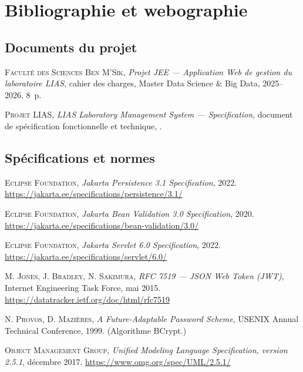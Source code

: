 \cleardoublepage
\chapter*{Bibliographie et webographie}

\section*{Documents du projet}

\begin{enumerate}[label={[\arabic*]},leftmargin=*]
  \item \textsc{Faculté des Sciences Ben M'Sik}, \emph{Projet JEE --- Application Web de
        gestion du laboratoire LIAS}, cahier des charges, Master Data Science \& Big Data,
        2025--2026, 8~p.
  \item \textsc{Projet LIAS}, \emph{LIAS Laboratory Management System --- Specification},
        document de spécification fonctionnelle et technique, .
\end{enumerate}

\section*{Spécifications et normes}

\begin{enumerate}[label={[\arabic*]},leftmargin=*,start=3]
  \item \textsc{Eclipse Foundation}, \emph{Jakarta Persistence 3.1 Specification}, 2022.
        \url{https://jakarta.ee/specifications/persistence/3.1/}
  \item \textsc{Eclipse Foundation}, \emph{Jakarta Bean Validation 3.0 Specification},
        2020. \url{https://jakarta.ee/specifications/bean-validation/3.0/}
  \item \textsc{Eclipse Foundation}, \emph{Jakarta Servlet 6.0 Specification}, 2022.
        \url{https://jakarta.ee/specifications/servlet/6.0/}
  \item \textsc{M. Jones, J. Bradley, N. Sakimura}, \emph{RFC 7519 --- JSON Web Token
        (JWT)}, Internet Engineering Task Force, mai 2015.
        \url{https://datatracker.ietf.org/doc/html/rfc7519}
  \item \textsc{N. Provos, D. Mazières}, \emph{A Future-Adaptable Password Scheme},
        USENIX Annual Technical Conference, 1999. (Algorithme BCrypt.)
  \item \textsc{Object Management Group}, \emph{Unified Modeling Language Specification,
        version 2.5.1}, décembre 2017. \url{https://www.omg.org/spec/UML/2.5.1/}
\end{enumerate}

